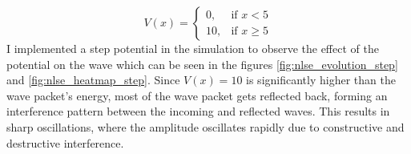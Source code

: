 \documentclass[8pt, a4paper, twocolumn]{article}
\begin{document}
\begin{equation}
	V(x) = \begin{cases}
		0, & \text{if } x < 5 \\
		10, & \text{if } x \geq 5
	\end{cases}
\end{equation}
I implemented a step potential in the simulation to observe the effect of the potential on the wave
which can be seen in the figures \ref{fig:nlse_evolution_step} and \ref{fig:nlse_heatmap_step}. Since $V(x) = 10$ is significantly higher than the wave packet’s energy, most of the wave packet 
gets reflected back, forming an interference pattern between the incoming and reflected waves. 
This results in sharp oscillations, where the amplitude oscillates rapidly due to constructive and 
destructive interference.
\end{document}
